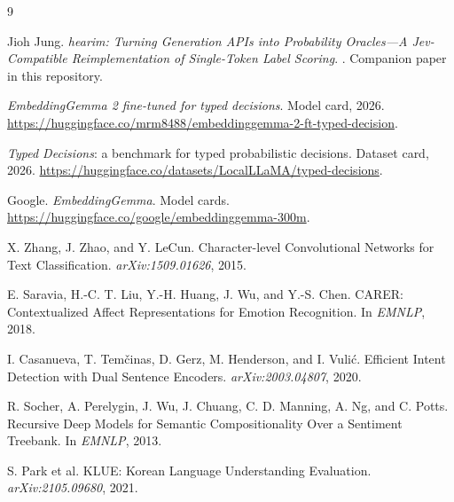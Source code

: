 \documentclass[11pt]{article}
\begin{document}
\begin{thebibliography}{9}

Jioh Jung.
\newblock \emph{hearim: Turning Generation APIs into Probability Oracles---A
Jev-Compatible Reimplementation of Single-Token Label Scoring}.
. Companion paper in this repository.

\newblock \emph{EmbeddingGemma 2 fine-tuned for typed decisions}.
\newblock Model card, 2026.
\newblock \url{https://huggingface.co/mrm8488/embeddinggemma-2-ft-typed-decision}.

\newblock \emph{Typed Decisions}: a benchmark for typed probabilistic decisions.
\newblock Dataset card, 2026.
\newblock \url{https://huggingface.co/datasets/LocalLLaMA/typed-decisions}.

Google.
\newblock \emph{EmbeddingGemma}.
\newblock Model cards.
\newblock \url{https://huggingface.co/google/embeddinggemma-300m}.

X. Zhang, J. Zhao, and Y. LeCun.
\newblock Character-level Convolutional Networks for Text Classification.
\newblock \emph{arXiv:1509.01626}, 2015.

E. Saravia, H.-C. T. Liu, Y.-H. Huang, J. Wu, and Y.-S. Chen.
\newblock CARER: Contextualized Affect Representations for Emotion Recognition.
\newblock In \emph{EMNLP}, 2018.

I. Casanueva, T. Tem\v{c}inas, D. Gerz, M. Henderson, and I. Vuli\'c.
\newblock Efficient Intent Detection with Dual Sentence Encoders.
\newblock \emph{arXiv:2003.04807}, 2020.

R. Socher, A. Perelygin, J. Wu, J. Chuang, C. D. Manning, A. Ng, and C. Potts.
\newblock Recursive Deep Models for Semantic Compositionality Over a Sentiment Treebank.
\newblock In \emph{EMNLP}, 2013.

S. Park et al.
\newblock KLUE: Korean Language Understanding Evaluation.
\newblock \emph{arXiv:2105.09680}, 2021.

\end{thebibliography}
\end{document}

